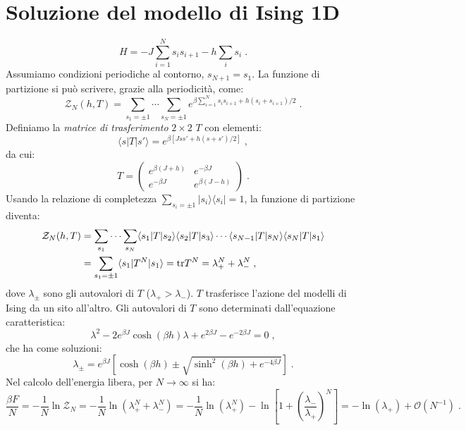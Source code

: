 \documentclass[10pt,a4paper]{report}
\theoremstyle{definition}
\numberwithin{equation}{section}
\newcommand{\bra}{\langle}
\newcommand{\ket}{\rangle}
\newcommand{\tr}{\mathrm{tr}}
\newcommand{\zpart}{\mathcal{Z}}
\begin{document}
\section{Soluzione del modello di Ising 1D}
\begin{equation}
H=-J\sum_{i=1}^Ns_is_{i+1}-h\sum_is_i\;.
\end{equation}
Assumiamo condizioni periodiche al contorno, $s_{N+1}=s_1$. La funzione di partizione si può scrivere, grazie alla periodicità, come:
\begin{equation}
\zpart_N(h,T)=\sum_{s_1=\pm 1}\cdots \sum_{s_N=\pm 1}e^{\beta \sum_{i=1}^Ns_is_{i+1}+h(s_i+s_{i+1})/2}\;.
\end{equation}
Definiamo la \emph{matrice di trasferimento} $2\times 2$ $T$ con elementi:
\begin{equation}
\bra s|T|s'\ket=e^{\beta[Jss'+h(s+s')/2]}\;,
\end{equation}
da cui:
\begin{equation}
T=\left(\begin{matrix}
e^{\beta(J+h)} & e^{-\beta J} \\
 e^{-\beta J} & e^{\beta(J-h)}
\end{matrix}\right)\;.
\end{equation}
Usando la relazione di completezza $\sum_{s_i=\pm 1}|s_i\ket\bra s_i|=1$, la funzione di partizione diventa:
\begin{align}
\zpart_N(h,T)&=\sum_{s_1}\cdots \sum_{s_N}\bra s_1|T|s_2\ket\bra s_2|T|s_3\ket \cdots \bra s_{N-1}|T|s_N\ket\bra s_N|T|s_1\ket \notag \\
&= \sum_{s_1=\pm 1}\bra s_1|T^N|s_1\ket=\tr T^N=\lambda_+^N+\lambda_-^N\;,
\end{align}
dove $\lambda_{\pm}$ sono gli autovalori di $T$ ($\lambda_+>\lambda_-$). $T$ trasferisce l'azione del modelli di Ising da un sito all'altro. Gli autovalori di $T$ sono determinati dall'equazione caratteristica:
\begin{equation}
\lambda^2-2e^{\beta J}\cosh(\beta h)\lambda+e^{2\beta J}-e^{-2\beta J}=0\;,
\end{equation}
che ha come soluzioni:
\begin{equation}
\lambda_{\pm}=e^{\beta J}\left[\cosh(\beta h)\pm \sqrt{\sinh^2(\beta h)+e^{-4\beta J}}\right]\;.
\end{equation}
Nel calcolo dell'energia libera, per $N\to \infty$ si ha:
$$
\frac{\beta F}{N}=-\frac{1}{N}\ln\zpart_N=-\frac{1}{N}\ln(\lambda_+^N+\lambda_-^N)=-\frac{1}{N}\ln(\lambda_+^N)-\ln\left[1+\left(\frac{\lambda_-}{\lambda_+}\right)^N\right]=-\ln(\lambda_+)+\mathcal{O}(N^{-1})\;.
$$
\end{document}
